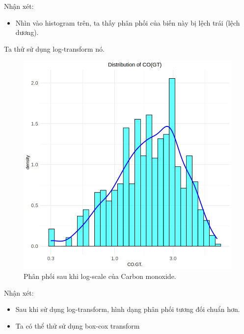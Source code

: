Nhận xét:
\begin{itemize}
    \item Nhìn vào histogram trên, ta thấy phân phối của biến này bị lệch trái (lệch dương).
\end{itemize}

Ta thử sử dụng log-transform nó.

\begin{figure}[H]
    \centering
    \includegraphics[width=0.75\columnwidth]{air_figures/CO(GT)_logscale_distribution.png}
    \caption{Phân phối sau khi log-scale của Carbon monoxide.}
    \label{fig:co_logscale_distribution}
\end{figure}
Nhận xét:
\begin{itemize}
    \item Sau khi sử dụng log-transform, hình dạng phân phối tương đối chuẩn hơn.
    \item Ta có thể thử sử dụng box-cox transform
\end{itemize}

